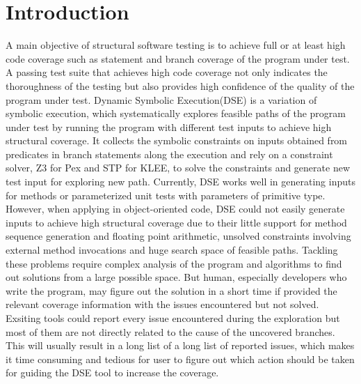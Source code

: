 \section{Introduction}
A main objective of structural software testing is to achieve full or at least high code coverage such as statement and branch coverage of the program under test. A passing test suite that achieves high code coverage not only indicates the thoroughness of the testing but also provides high confidence of the quality of the program under test. Dynamic Symbolic Execution(DSE)\cite{CadarGPDE06,GodefroidKS05,SenMA05} is a variation of symbolic execution, which systematically explores feasible paths of the program under test by running the program with different test inputs to achieve high structural coverage. It collects the symbolic constraints on inputs obtained from predicates in branch statements along the execution and rely on a constraint solver, Z3 for Pex\cite{TillmannH08} and STP\cite{stp} for KLEE\cite{klee}, to solve the constraints and generate new test input for exploring new path. Currently, DSE works well in generating inputs for methods or parameterized unit tests with parameters of primitive type. However, when applying in  object-oriented code, DSE could not easily generate inputs to achieve high structural coverage due to their little support for method sequence generation and floating point arithmetic, unsolved constraints involving external method invocations and huge search space of feasible paths. Tackling these problems require complex analysis of the program and algorithms to find out solutions from a large possible space. But human, especially developers who write the program, may figure out the solution in a short time if provided the relevant coverage information with the issues encountered but not solved. Exsiting tools could report every issue encountered during the exploration but most of them are not directly related to the cause of the uncovered branches. This will usually result in a long list of a long list of reported issues, which makes it time consuming and tedious for user to figure out which action should be taken for guiding the DSE tool to increase the coverage.

